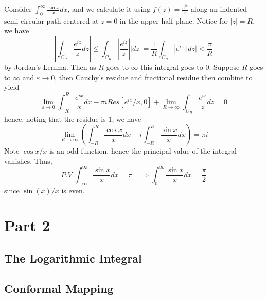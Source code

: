 \documentclass[12pt, a4paper, oneside, openright, titlepage]{book}
\begin{document}
\begin{eg}
    Consider $\int_0^{\infty}\frac{\sin x}{x}dx$, and we calculate it using $f(z) = \frac{e^{iz}}{z}$ along an indented semi-circular path centered at $z = 0$ in the upper half plane. Notice for $|z| = R$, we have \begin{equation*}
        \left|\int_{C_R}\frac{e^{iz}}{z}dz\right| \leq \int_{C_R}\left|\frac{e^{iz}}{z}\right||dz| = \frac{1}{R}\int_{C_R}\left|e^{iz}\right||dz| < \frac{\pi}{R}
    \end{equation*}
    by Jordan's Lemma. Then as $R$ goes to $\infty$ this integral goes to $0$. Suppose $R$ goes to $\infty$ and $\varepsilon \rightarrow 0$, then Cauchy's residue and fractional residue then combine to yield \begin{equation*}
        \lim\limits_{\varepsilon\rightarrow 0}\int_{-R}^R\frac{e^{ix}}{x}dx - \pi iRes[e^{ix}/x, 0] + \lim\limits_{R\rightarrow \infty}\int_{C_R}\frac{e^{iz}}{z}dz = 0
    \end{equation*}
    hence, noting that the residue is $1$, we have \begin{equation*}
        \lim\limits_{R\rightarrow \infty}\left(\int_{-R}^{R}\frac{\cos x}{x}dx + i\int_{-R}^{R}\frac{\sin x}{x}dx\right) = \pi i
    \end{equation*}
    Note $\cos x/x$ is an odd function, hence the principal value of the integral vanishes. Thus, \begin{equation*}
        P.V.\int_{-\infty}^{\infty}\frac{\sin x}{x}dx = \pi\;\;\implies \int_0^{\infty}\frac{\sin x}{x}dx = \frac{\pi}{2}
    \end{equation*}
    since $\sin(x)/x$ is even.
\end{eg}







\part{Part 2}

\chapter{The Logarithmic Integral}




\chapter{Conformal Mapping}
\end{document}
